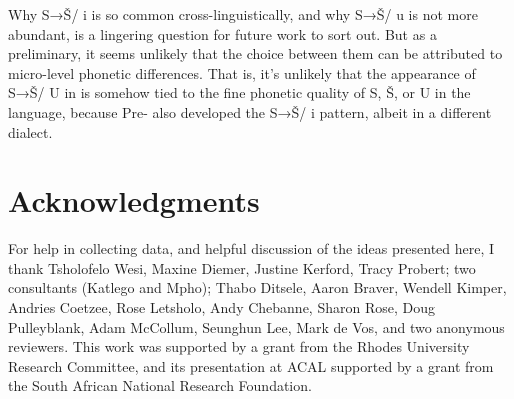 \documentclass[output=paper,newtxmath,modfonts,nonflat]{langsci/langscibook}
\begin{document}
Why S→Š/ {\longrule} i is so common cross-linguistically, and why S→Š/ {\longrule} u is not more abundant, is a lingering question for future work to sort out. But as a preliminary, it seems unlikely that the choice between them can be attributed to micro-level phonetic differences. That is, it’s unlikely that the appearance of S→Š/ {\longrule} U in  is somehow tied to the fine phonetic quality of S, Š, or U in the language, because Pre- also developed the S→Š/ {\longrule} i pattern, albeit in a different dialect.

\section*{Acknowledgments}

For help in collecting  data, and helpful discussion of the ideas presented here, I thank Tsholofelo Wesi, Maxine Diemer, Justine Kerford, Tracy Probert; two  consultants (Katlego and Mpho); Thabo Ditsele, Aaron Braver, Wendell Kimper, Andries Coetzee, Rose Letsholo, Andy Chebanne, Sharon Rose, Doug Pulleyblank, Adam McCollum, Seunghun Lee, Mark de Vos, and two anonymous reviewers. This work was supported by a grant from the Rhodes University Research Committee, and its presentation at ACAL supported by a grant from the South African National Research Foundation.

\sloppy
\printbibliography[heading=subbibliography,notkeyword=this]
\end{document}
